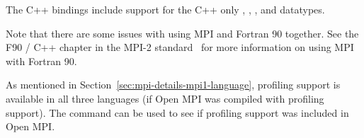 The C++ bindings include support for the C++ only ,
, , and
 datatypes.

Note that there are some issues with using MPI and Fortran 90
together.  See the F90 / C++ chapter in the MPI-2
standard~\cite{geist96:_mpi2_lyon} for more information on using MPI
with Fortran 90.

As mentioned in Section~\ref{sec:mpi-details-mpi1-language}, profiling
support is available in all three languages (if Open MPI was compiled
with profiling support).  The  command can be used to
see if profiling support was included in Open MPI.

